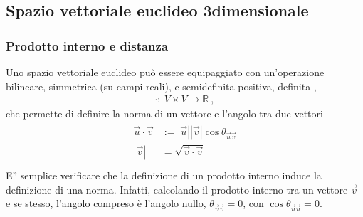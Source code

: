 \documentclass[letterpaper,10pt,italian]{jupyterBook}
\begin{document}
\sphinxstepscope


\subsection{Spazio vettoriale euclideo 3\sphinxhyphen{}dimensionale}
\label{\detokenize{ch/algebra/vector-algebra-euclidean-space-3d:spazio-vettoriale-euclideo-3-dimensionale}}\label{\detokenize{ch/algebra/vector-algebra-euclidean-space-3d:math-hs-algebra-vector-euclidean-space-3d}}\label{\detokenize{ch/algebra/vector-algebra-euclidean-space-3d::doc}}

\subsubsection{Prodotto interno e distanza}
\label{\detokenize{ch/algebra/vector-algebra-euclidean-space-3d:prodotto-interno-e-distanza}}\label{\detokenize{ch/algebra/vector-algebra-euclidean-space-3d:math-hs-algebra-vector-euclidean-space-3d-inner-product}}
\sphinxAtStartPar
Uno spazio vettoriale euclideo può essere equipaggiato con un’operazione bilineare, simmetrica (su campi reali), e semi\sphinxhyphen{}definita positiva, definita ,
\begin{equation*}
\begin{split}\cdot: \ V \times V \rightarrow \mathbb{R} \ ,\end{split}
\end{equation*}
\sphinxAtStartPar
che permette di definire la norma di un vettore e l’angolo tra due vettori
\begin{equation*}
\begin{split}\begin{aligned}
  \vec{u} \cdot \vec{v} & := |\vec{u}||\vec{v}| \cos \theta_{\vec{u} \vec{v}}  \\
              |\vec{v}| & = \sqrt{\vec{v} \cdot \vec{v}}  \\
\end{aligned}\end{split}
\end{equation*}
\sphinxAtStartPar
E” semplice verificare che la definizione di un prodotto interno induce la definizione di una norma. Infatti, calcolando il prodotto interno tra un vettore \(\vec{v}\) e se stesso, l’angolo compreso è l’angolo nullo, \(\theta_{\vec{v} \vec{v}} = 0\), con \(\cos \theta_{\vec{u}\vec{u}} = 0\).
\end{document}
